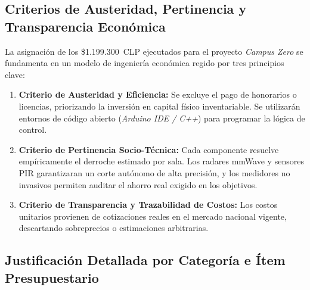 \newpage
\subsection{Criterios de Austeridad, Pertinencia y Transparencia Económica}
\label{sec:justificaciones}

La asignación de los \$1.199.300~CLP ejecutados para el proyecto \textit{Campus Zero} se fundamenta en un modelo de ingeniería económica regido por tres principios clave:

\begin{enumerate}
    \item \textbf{Criterio de Austeridad y Eficiencia:} Se excluye el pago de honorarios o licencias, priorizando la inversión en capital físico inventariable. Se utilizarán entornos de código abierto (\textit{Arduino IDE / C++}) para programar la lógica de control.
    
    \item \textbf{Criterio de Pertinencia Socio-Técnica:} Cada componente resuelve empíricamente el derroche estimado por sala. Los radares mmWave y sensores PIR garantizaran un corte autónomo de alta precisión, y los medidores no invasivos permiten auditar el ahorro real exigido en los objetivos.
    
    \item \textbf{Criterio de Transparencia y Trazabilidad de Costos:} Los costos unitarios provienen de cotizaciones reales en el mercado nacional vigente, descartando sobreprecios o estimaciones arbitrarias.
\end{enumerate}

\vspace{-0.2cm}

\subsection{Justificación Detallada por Categoría e Ítem Presupuestario}

